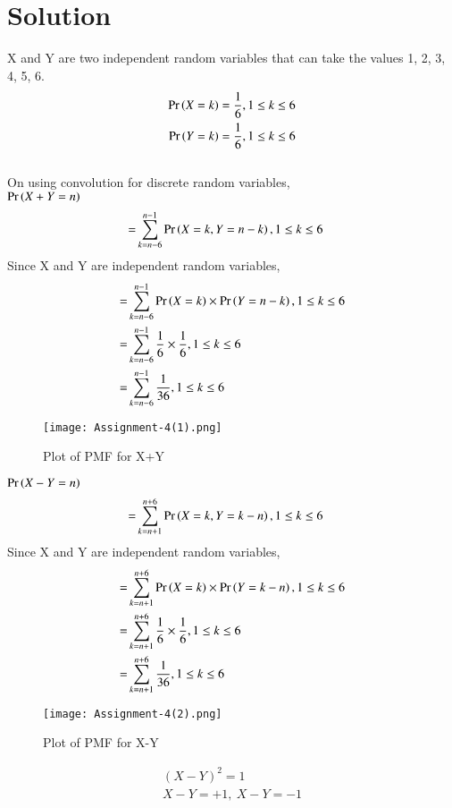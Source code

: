 \documentclass[journal,12pt,twocolumn]{IEEEtran}
\begin{document}
\section*{Solution}
X and Y are two independent random variables that can take the values 1, 2, 3, 4, 5, 6.\\ 
\begin{align}
    \Pr\left(X=k\right)=\frac{1}{6}, 1\leq k \leq 6\\
    \Pr\left(Y=k\right)=\frac{1}{6}, 1\leq k \leq 6
\end{align}
\\
On using convolution for discrete random variables,\\
$\Pr\left(X+Y=n\right)$
\begin{align}
    =&\sum_{k=n-6}^{n-1} \Pr\left(X=k,Y=n-k\right), 1\leq k \leq 6
\end{align}
Since X and Y are independent random variables,
\begin{align}
    =&\sum_{k=n-6}^{n-1} \Pr\left(X=k\right)\times\Pr\left(Y=n-k\right), 1\leq k \leq 6\\
    =&\sum_{k=n-6}^{n-1} \frac{1}{6}\times\frac{1}{6}, 1\leq k \leq 6\\
    =&\sum_{k=n-6}^{n-1} \frac{1}{36}, 1\leq k \leq 6
\end{align}
\begin{figure}[htb]
    \texttt{[image: Assignment-4(1).png]}
    \caption{Plot of PMF for X+Y}
\end{figure}
$\Pr\left(X-Y=n\right)$
\begin{align}
    =&\sum_{k=n+1}^{n+6} \Pr\left(X=k,Y=k-n\right), 1\leq k \leq 6
\end{align}
Since X and Y are independent random variables,
\begin{align}
    =&\sum_{k=n+1}^{n+6} \Pr\left(X=k\right)\times\Pr\left(Y=k-n\right), 1\leq k \leq 6\\
    =&\sum_{k=n+1}^{n+6} \frac{1}{6}\times\frac{1}{6}, 1\leq k \leq 6\\
    =&\sum_{k=n+1}^{n+6} \frac{1}{36}, 1\leq k \leq 6
\end{align}
\begin{figure}[htb]
    \texttt{[image: Assignment-4(2).png]}
    \caption{Plot of PMF for X-Y}
\end{figure}
\begin{align}
    (X-Y)^2=1\\
    X-Y=+1,\:X-Y=-1
\end{align}
\end{document}
